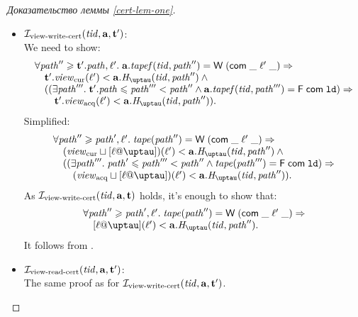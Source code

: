 \begin{proof}[Доказательство леммы \ref{cert-lem-one}]
\begin{itemize}
\begin{itemize}
          \item $\mathcal{I}_{\textup{\rm view-write-cert}}(\mathit{tid}, \mathbf{a}, \mathbf{t}')$: \\
            We need to show:
            \[\begin{array}{l}
      \forall \cpath'' \ge \tT'.\cpath, \loc'. \; \aT.\tapef(\tId, \cpath'') = \tapeWrite{(\tapeWriteCommitted{\_}{\loc'}{\_})} \Rightarrow \\
      \quad \tT'.\Rcur(\loc') < \aT.\tmap(\tId, \cpath'') \land {} \\
      \quad ((\exists \cpath'''. \; \tT'.\cpath \le \cpath''' < \cpath'' \land 
             \aT.\tapef(\tId, \cpath''') = \tapeFence{\Committed}{\LD}) \Rightarrow \\
      \qquad \tT'.\Racq(\loc') < \aT.\tmap(\tId, \cpath'')).\\
            \end{array}\]
            Simplified:
            \[\begin{array}{l}
      \forall \cpath'' \ge \cpath', \loc'. \; \tape(\cpath'') = \tapeWrite{(\tapeWriteCommitted{\_}{\loc'}{\_})} \Rightarrow \\
      \quad (\Rcur \sqcup [\loc @ \tau])(\loc') < \aT.\tmap(\tId, \cpath'') \land {} \\
      \quad ((\exists \cpath'''. \; \cpath' \le \cpath''' < \cpath'' \land 
             \tape(\cpath''') = \tapeFence{\Committed}{\LD}) \Rightarrow \\
      \qquad (\Racq \sqcup [\loc @ \tau])(\loc') < \aT.\tmap(\tId, \cpath'')).\\
            \end{array}\]
            As $\mathcal{I}_{\textup{\rm view-write-cert}}(\mathit{tid}, \mathbf{a}, \mathbf{t})$ holds, it's enough to show that:
            \[\begin{array}{l}
      \forall \cpath'' \ge \cpath', \loc'. \; \tape(\cpath'') = \tapeWrite{(\tapeWriteCommitted{\_}{\loc'}{\_})} \Rightarrow \\
      \quad [\loc @ \tau](\loc') < \aT.\tmap(\tId, \cpath'').
            \end{array}\]
            It follows from \app{\ref{thm:invAview}}.
          \item $\mathcal{I}_{\textup{\rm view-read-cert}}(\mathit{tid}, \mathbf{a}, \mathbf{t}')$: \\
            The same proof as for $\mathcal{I}_{\textup{\rm view-write-cert}}(\mathit{tid}, \mathbf{a}, \mathbf{t}')$.
      \end{itemize}


\end{itemize}
\end{proof}
